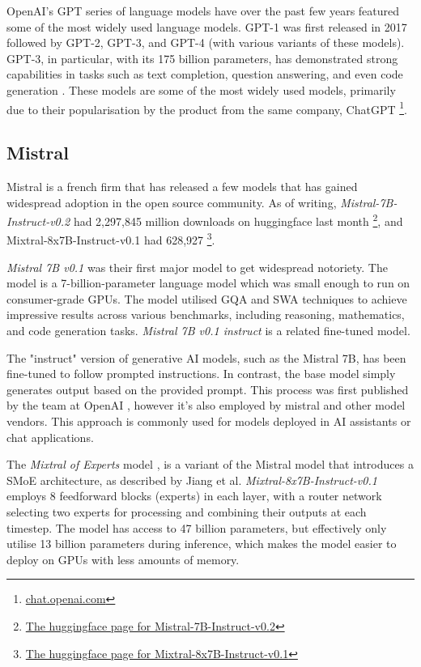 OpenAI's \gls{GPT} series of language models have over the past few years featured some of the most widely used language models. GPT-1 was first released in 2017 followed by GPT-2, GPT-3, and GPT-4 (with various variants of these models). GPT-3, in particular, with its 175 billion parameters, has demonstrated strong capabilities in tasks such as text completion, question answering, and even code generation \cite{brown_language_2020}. These models are some of the most widely used models, primarily due to their popularisation by the product from the same company, ChatGPT \footnote{\href{https://chat.openai.com}{chat.openai.com}}.


\subsection{Mistral}
\label{sec:mistral_models}


Mistral is a french firm that has released a few models that has gained widespread adoption in the open source community. As of writing, \textit{Mistral-7B-Instruct-v0.2} had 2,297,845 million downloads on huggingface last month \footnote{\href{https://huggingface.co/mistralai/Mistral-7B-Instruct-v0.2}{The huggingface page for Mistral-7B-Instruct-v0.2}}, and Mixtral-8x7B-Instruct-v0.1 had 628,927 \footnote{\href{https://huggingface.co/mistralai/Mixtral-8x7B-Instruct-v0.1}{The huggingface page for Mixtral-8x7B-Instruct-v0.1}}.


\textit{Mistral 7B v0.1} \cite{jiang_mistral_2023} was their first major model to get widespread notoriety. The model is a 7-billion-parameter language model which was small enough to run on consumer-grade GPUs. The model utilised \gls{GQA}\cite{ainslie_gqa_2023} and \gls{SWA} \cite{roy_efficient_2020} techniques to achieve impressive results across various benchmarks, including reasoning, mathematics, and code generation tasks. \textit{Mistral 7B v0.1 instruct} is a related fine-tuned model.


The "instruct" version of generative AI models, such as the Mistral 7B, has been fine-tuned to follow prompted instructions. In contrast, the base model simply generates output based on the provided prompt. This process was first published by the team at OpenAI \cite{ouyang_training_2022}, however it’s also employed by mistral and other model vendors. This approach is commonly used for models deployed in AI assistants or chat applications.


The \textit{Mixtral of Experts} model \cite{jiang_mixtral_2024}, is a variant of the Mistral model that introduces a \gls{SMoE} architecture, as described by Jiang et al. \textit{Mixtral-8x7B-Instruct-v0.1} employs 8 feedforward blocks (experts) in each layer, with a router network selecting two experts for processing and combining their outputs at each timestep. The model has access to 47 billion parameters, but effectively only utilise 13 billion parameters during inference, which makes the model easier to deploy on GPUs with less amounts of memory.


